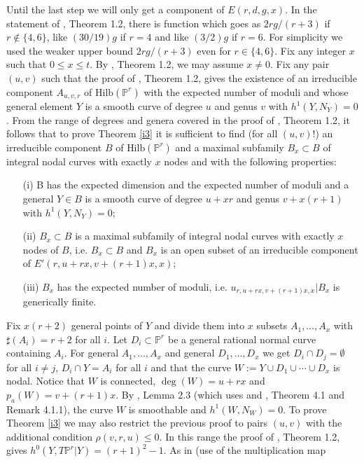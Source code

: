 \documentclass{amsart}
\theoremstyle{plain}
\theoremstyle{definition}
\begin{document}
 Until the last step we will only get a component of $E(r,d,g,x)$. In the statement of \cite{l2}, Theorem 1.2, there is  function which goes as $2rg/(r+3)$ if $r\notin \{4,6\}$, like $(30/19)g$ if $r=4$ and
like $(3/2)g$ if $r=6$. For simplicity we used the weaker upper bound $2rg/(r+3)$ even for $r\in \{4,6\}$. Fix
any integer $x$ such that $0\le x \le t$. By \cite{l2}, Theorem 1.2, we may assume $x\ne 0$. Fix any
pair $(u,v)$ such that the proof of \cite{l2}, Theorem 1.2, gives the existence of an irreducible component
$A_{u,v,r}$ of $\mbox{Hilb}(\mathbb {P}^r)$ with the expected number of moduli
and whose general element $Y$ is a smooth curve of degree $u$ and genus $v$ with $h^1(Y,N_Y)=0$. From
the range of degrees and genera covered in the proof of \cite{l2}, Theorem 1.2, it
follows that to prove Theorem \ref{i3} it is sufficient to find (for all $(u,v)$!)
an irreducible component $B$ of $\mbox{Hilb}(\mathbb {P}^r)$ and a maximal subfamily $B_x\subset B$ of integral nodal curves with exactly
$x$ nodes and with the following properties:
\begin{itemize}
\item[(i)] B has the expected dimension and the expected number of moduli
and a general $Y\in B$ is a smooth curve of degree $u+xr$ and genus $v+x(r+1)$ with $h^1(Y,N_Y)=0$;
\item[(ii)] $B_x \subset B$ is a maximal subfamily of integral nodal curves with exactly
$x$ nodes of $B$, i.e. $B_x\subset B$ and $B_x$ is an open subset of an irreducible component of
$E'(r,u+rx,v+(r+1)x,x)$;
\item[(iii)] $B_x$ has the expected number of moduli, i.e. $u_{r,u+rx,v+(r+1)x,x}\vert B_x$ is generically
finite.
\end{itemize}
Fix $x(r+2)$ general points of $Y$ and divide them into $x$ subsets $A_1,\dots ,A_x$ with $\sharp (A_i)=r+2$
for all $i$. Let $D_i\subset \mathbb {P}^r$ be a general rational normal curve containing $A_i$. For
general $A_1,\dots ,A_x$ and general $D_1,\dots ,D_x$ we get $D_i\cap D_j=\emptyset$ for all $i\ne j$,
$D_i\cap Y = A_i$ for all $i$ and that the curve $W:= Y\cup D_1\cup \cdots \cup D_x$ is nodal. Notice that
$W$ is connected, $\deg (W)=u+rx$ and $p_a(W)=v+(r+1)x$. By \cite{be4}, Lemma 2.3 (which uses \cite{s1} and \cite{hh}, Theorem 4.1 and Remark 4.1.1), the curve $W$ is smoothable and $h^1(W,N_W)=0$.
To prove Theorem \ref{i3} we may also restrict the previous proof to pairs $(u,v)$ with the additional condition $\rho (v,r,u) \le 0$. In this
range the proof of \cite{l2}, Theorem 1.2, gives $h^0(Y,T\mathbb {P}^r\vert Y) = (r+1)^2-1$. As in \cite{s1} (use of the multiplication map
\end{document}

